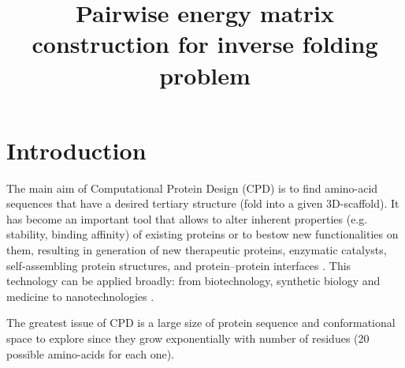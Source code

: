 \documentclass[12pt,twoside]{article}
\title
    [Pairwise energy matrix construction for inverse folding problem] %
    {Pairwise energy matrix construction for inverse folding problem}
\author
    {Rubinstein~A.} %
    [Rubinstein~A.$^1$] %
\begin{document}
\maketitle

















\section{Introduction}
\bigskip
The main aim of Computational Protein Design (CPD) is
to find amino-acid sequences that have a desired tertiary
structure (fold into a given 3D-scaffold). It has become an important tool that allows to alter inherent properties (e.g. stability, binding affinity) of existing proteins or to bestow new functionalities on them, resulting in generation of new therapeutic proteins, enzymatic catalysts, self-assembling protein
structures, and protein–protein interfaces \cite{Chen:2009}. This technology can be applied broadly: from biotechnology, synthetic biology and medicine to nanotechnologies \cite{Palomo:2015}.

The greatest issue of CPD is a large size of protein sequence and conformational space to explore since they grow exponentially with number of residues (20 possible amino-acids for each one).
\end{document}
